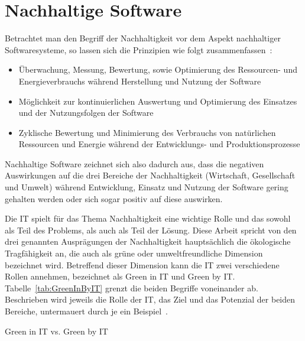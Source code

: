 \section{Nachhaltige Software}\label{CAP:sustainable-software}
Betrachtet man den Begriff der Nachhaltigkeit vor dem Aspekt nachhaltiger Softwaresysteme, so lassen sich die Prinzipien wie folgt zusammenfassen~\cite{Calero.2015}:
\begin{itemize}
 \item Überwachung, Messung, Bewertung, sowie Optimierung des Ressourcen- und Energieverbrauchs während Herstellung und Nutzung der Software
\item Möglichkeit zur kontinuierlichen Auswertung und Optimierung des Einsatzes und der Nutzungsfolgen der Software
\item Zyklische Bewertung und Minimierung des Verbrauchs von natürlichen Ressourcen und Energie während der Entwicklungs- und Produktionsprozesse
\end{itemize}
Nachhaltige Software zeichnet sich also dadurch aus, dass die negativen Auswirkungen auf die drei Bereiche der Nachhaltigkeit (Wirtschaft, Gesellschaft und Umwelt) während Entwicklung, Einsatz und Nutzung der Software gering gehalten werden oder sich sogar positiv auf diese auswirken.

Die \ac{IT} spielt für das Thema Nachhaltigkeit eine wichtige Rolle und das sowohl als Teil des Problems, als auch als Teil der Lösung.
Diese Arbeit spricht von den drei genannten Ausprägungen der Nachhaltigkeit hauptsächlich die ökologische Tragfähigkeit an, die auch als \glqq grüne\grqq{} oder \glqq umweltfreundliche\grqq{} Dimension bezeichnet wird.
Betreffend dieser Dimension kann die \ac{IT} zwei verschiedene Rollen annehmen, bezeichnet als Green in \ac{IT} und Green by \ac{IT}\@.
Tabelle~\ref{tab:GreenInByIT} grenzt die beiden Begriffe voneinander ab.
Beschrieben wird jeweils die Rolle der \ac{IT}, das Ziel und das Potenzial der beiden Bereiche, untermauert durch je ein Beispiel~\cite{Calero.2015}.

\begin{table}[t]
 \centering\small
 \caption{Green in IT vs. Green by IT}
 \label{tab:GreenInByIT}
 
\end{table}


